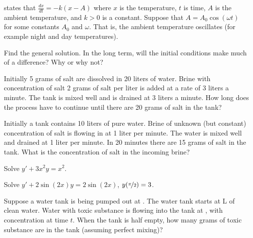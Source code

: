 \begin{exercise}
 states that $\frac{dx}{dt} = -k(x-A)$ where
$x$ is the temperature, $t$ is time, $A$ is the ambient temperature,
and $k > 0$ is a constant.
Suppose that $A = A_0 \cos (\omega t)$ for some constants $A_0$ and $\omega$.
That is, the ambient temperature oscillates (for example night and day
temperatures).
\begin{tasks}
\task Find the general solution.
\task In the long term, will the
initial conditions make much of a difference?  Why or why not?
\end{tasks}
\end{exercise}

\begin{exercise}
Initially 5 grams of salt are dissolved in 20 liters of water.  Brine
with concentration of salt 2 grams of salt per liter is added at a rate
of 3 liters a minute.  The tank is mixed well and is drained at 3 liters
a minute.  How long does the process have to continue until there are 20 grams
of salt in the tank?
\end{exercise}

\begin{exercise}
Initially a tank contains 10 liters of pure water.
Brine of unknown (but constant) concentration
of salt is flowing in at 1 liter per minute.
The water is mixed well and drained at 1 liter per minute.
In 20 minutes there are 15 grams of salt in the tank.  What is the
concentration of salt in the incoming brine?
\end{exercise}

\setcounter{exercise}{100}

\begin{exercise}
Solve $y'+3 x^2 y = x^2$.
\end{exercise}

\begin{exercise}
Solve $y'+ 2\sin(2x) y = 2\sin(2x)$, $y(\nicefrac{\pi}{2}) = 3$.
\end{exercise}

\begin{exercise}
Suppose a water tank is being pumped out at .  The
water tank starts at \unit[10]{L} of clean water.
Water with
toxic substance is flowing into the tank at ,
with concentration  at time $t$.
When the tank is half empty, how many grams of toxic substance are in the
tank (assuming perfect mixing)?
\end{exercise}

